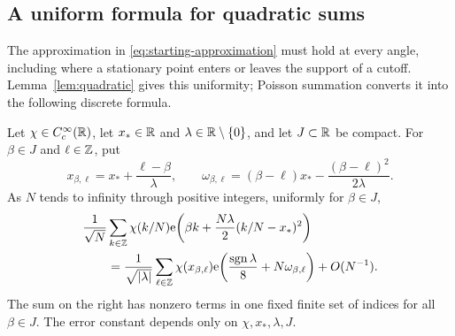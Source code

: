 \subsection{A uniform formula for quadratic sums}

The approximation in \eqref{eq:starting-approximation} must hold at
every angle, including where a stationary point enters or leaves the
support of a cutoff.  Lemma~\ref{lem:quadratic} gives this uniformity;
Poisson summation converts it into the following discrete formula.

\begin{lemma}
\label{lem:sampling-poisson}
Let $\chi\in C_c^\infty(\mathbb R)$, let $x_*\in\mathbb R$ and
$\lambda\in\mathbb R\setminus\{0\}$, and let $J\subset\mathbb R$ be compact.
For $\beta\in J$ and $\ell\in\mathbb Z$, put
\[
 x_{\beta,\ell}=x_*+\frac{\ell-\beta}{\lambda},
 \qquad
 \omega_{\beta,\ell}=(\beta-\ell)x_*
                  -\frac{(\beta-\ell)^2}{2\lambda}.
\]
As $N$ tends to infinity through positive integers, uniformly for
$\beta\in J$,
\begin{align}
 &\frac1{\sqrt N}\sum_{k\in\mathbb Z}\chi(k/N)
   \mathrm e\!\left(\beta k+\frac{N\lambda}{2}(k/N-x_*)^2\right)
 \notag\\
 &\qquad=
 \frac1{\sqrt{|\lambda|}}
 \sum_{\ell\in\mathbb Z}\chi(x_{\beta,\ell})
 \mathrm e\!\left(\frac{\operatorname{sgn}\lambda}{8}
                      +N\omega_{\beta,\ell}\right)
 +O(N^{-1}).
 \label{eq:sampling-poisson}
\end{align}
The sum on the right has nonzero terms in one fixed finite set of
indices for all $\beta\in J$.  The error constant depends only on
$\chi,x_*,\lambda,J$.
\end{lemma}

